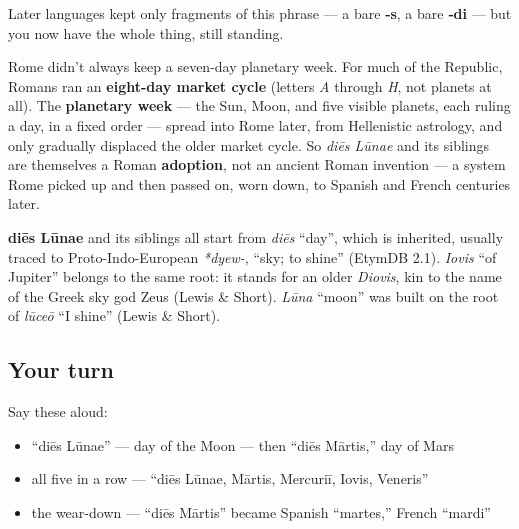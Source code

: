 Later languages kept only fragments of this phrase — a bare \textbf{‑s}, a bare \textbf{‑di} — but you now have the whole thing, still standing.

\begin{culture}
Rome didn't always keep a seven-day planetary week. For much of the Republic, Romans ran an \textbf{eight-day market cycle} (letters \emph{A} through \emph{H}, not planets at all). The \textbf{planetary week} — the Sun, Moon, and five visible planets, each ruling a day, in a fixed order — spread into Rome later, from Hellenistic astrology, and only gradually displaced the older market cycle. So \emph{diēs Lūnae} and its siblings are themselves a Roman \textbf{adoption}, not an ancient Roman invention — a system Rome picked up and then passed on, worn down, to Spanish and French centuries later.
\end{culture}

\begin{cousinweb}
\textbf{diēs Lūnae} and its siblings all start from \emph{diēs} \textquotedblleft{}day\textquotedblright{}, which is inherited, usually traced to Proto-Indo-European \emph{*dyew-}, \textquotedblleft{}sky; to shine\textquotedblright{} (EtymDB 2.1). \emph{Iovis} \textquotedblleft{}of Jupiter\textquotedblright{} belongs to the same root: it stands for an older \emph{Diovis}, kin to the name of the Greek sky god Zeus (Lewis \& Short). \emph{Lūna} \textquotedblleft{}moon\textquotedblright{} was built on the root of \emph{lūceō} \textquotedblleft{}I shine\textquotedblright{} (Lewis \& Short).
\end{cousinweb}

\subsection*{Your turn}
Say these aloud:

\begin{itemize}
\raggedright
  \item \textquotedblleft{}diēs Lūnae\textquotedblright{} — day of the Moon — then \textquotedblleft{}diēs Mārtis,\textquotedblright{} day of Mars
  \item all five in a row — \textquotedblleft{}diēs Lūnae, Mārtis, Mercuriī, Iovis, Veneris\textquotedblright{}
  \item the wear-down — \textquotedblleft{}diēs Mārtis\textquotedblright{} became Spanish \textquotedblleft{}martes,\textquotedblright{} French \textquotedblleft{}mardi\textquotedblright{}
\end{itemize}

